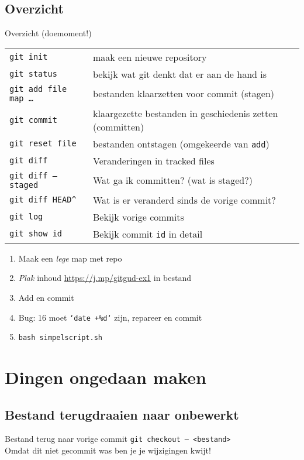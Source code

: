 \subsection{Overzicht}
\begin{frame}{Overzicht (doemoment!)}
	{ \footnotesize
	\begin{tabular}{ll}
		\texttt{git init}					& maak een nieuwe repository \\
		\texttt{git status} 				& bekijk wat git denkt dat er aan de hand is \\
		\texttt{git add file map \ldots}	& bestanden klaarzetten voor commit (stagen)	\\
		\texttt{git commit} 				& klaargezette bestanden in geschiedenis zetten (committen)\\
		\texttt{git reset file}		    	& bestanden ontstagen (omgekeerde van \texttt{add})	\\
		\hline
		\texttt{git diff}					& Veranderingen in tracked files					\\
		\texttt{git diff --staged}			& Wat ga ik committen? (wat is staged?)				\\
		\texttt{git diff HEAD\^}			& Wat is er veranderd sinds de vorige commit?		\\
		\hline
		\texttt{git log}					& Bekijk vorige commits								\\
		\texttt{git show id}				& Bekijk commit \texttt{id} in detail
	\end{tabular}
	}
	\begin{enumerate}
		\item Maak een \emph{lege} map met repo
		\item \emph{Plak} inhoud \url{https://j.mp/gitgud-ex1} in bestand
		\item Add en commit
		\item Bug: 16 moet \texttt{`date +\%d`} zijn, repareer en commit
		\item \texttt{bash simpelscript.sh}
	\end{enumerate}
\end{frame}

\section[Ongedaan]{Dingen ongedaan maken}

\subsection{Bestand terugdraaien naar onbewerkt}
\begin{frame}{Bestand terug naar vorige commit}
	\texttt{git checkout -- <bestand>} \\
	\alert{Omdat dit niet gecommit was ben je je wijzigingen kwijt!}
\end{frame}

